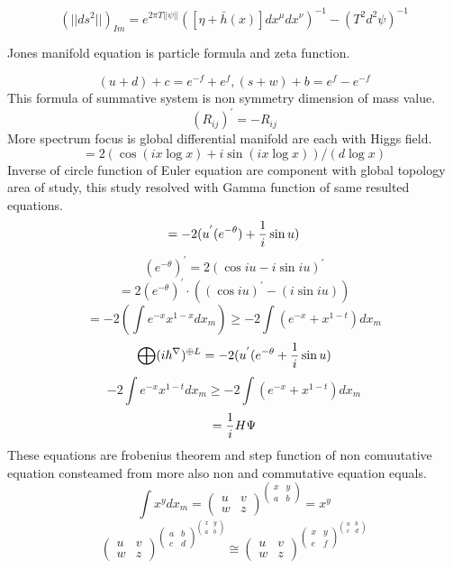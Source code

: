 \documentclass{jsarticle}
\begin{document}
  $$ (||ds^2||)_{Im} = e^{2\pi T||\psi||}\left([\eta + \bar{h}(x)]
  dx^{\mu}dx^{\nu}\right)^{-1} - \left(T^{2} d^2 \psi\right)^{-1}$$

     Jones manifold equation is particle formula and zeta function.

  $$ (u + d) +c = e^{-f} + e^{f}, (s + w) + b = e^f - e^{-f} $$
     This formula of summative system is non symmetry dimension of mass value.
  $$ (R_{ij})^{'} = - R_{ij} $$
     More spectrum focus is global differential manifold are each with Higgs
  field.
  $$ = 2(\cos (i x \log x) + i \sin(i x \log x))/(d \log x) $$
     Inverse of circle function of Euler equation are component with 
  global topology area of study, this study resolved with Gamma function
  of same resulted equations.
  $$ = - 2 (u^{'}(e^{-\theta}) + {1 \over i}  \sin u)$$
  $$ (e^{-\theta})^{'} = 2(\cos i u - i \sin i u)^{'} $$
  $$ = 2(e^{- \theta})^{'}\cdot ((\cos i u)^{'} - (i \sin i u)) $$
  $$ = -2 (\int e^{-x}x^{1 - x}dx_m) \ge -2\int(e^{-x} + x^{1 - t})dx_m $$
  $$ \bigoplus (i \hbar^{\nabla})^{\oplus L} = - 2(u^{'}(e^{-\theta} + {1 \over
  i} \sin u) $$
  $$ -2 \int e^{-x} x^{1 - t}dx_m \ge - 2\int(e^{-x} + x^{1 - t})dx_m $$
  $$ = {1 \over i}H \Psi $$
     These equations are frobenius theorem and step function of non comuutative
  equation consteamed from more also non and commutative equation equals.
  $$ \int x^y dx_m = \begin{pmatrix} u & v \\
  w & z \end{pmatrix}^{\begin{pmatrix} x & y \\
  a & b \end{pmatrix}} = x^y  $$
  $$ \begin{pmatrix} u & v \\
  w & z \end{pmatrix}^{\begin{pmatrix}a & b \\
c & d \end{pmatrix}^{\begin{pmatrix}x & y \\
  a & b \end{pmatrix}}} \cong  \begin{pmatrix} u & v \\
  w & z \end{pmatrix}^{\begin{pmatrix} x & y \\
e & f \end{pmatrix}^{\begin{pmatrix} a & b \\
  c & d \end{pmatrix}}} $$
\end{document}
